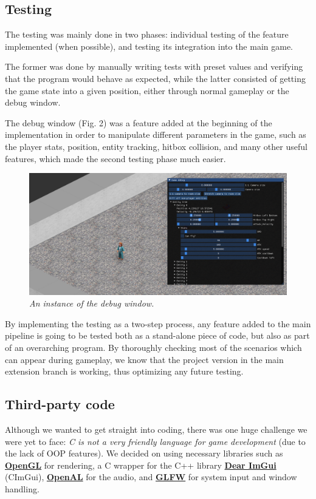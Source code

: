 \documentclass{article}
\begin{document}
\subsection{Testing}
The testing was mainly done in two phases: individual testing of the feature implemented (when possible), and testing its integration into the main game.\par
The former was done by manually writing tests with preset values and verifying that the program would behave as expected, while the latter consisted of getting the game state into a given position, either through normal gameplay or the debug window. \par
The debug window (Fig. 2) was a feature added at the beginning of the implementation in order to manipulate different parameters in the game, such as the player stats, position, entity tracking, hitbox collision, and many other useful features, which made the second testing phase much easier.
\begin{figure}[H]
\includegraphics[scale=0.3]{images/debugwindow.png}
\centering
\caption{\textit{An instance of the debug window.}}
\end{figure}
By implementing the testing as a two-step process, any feature added to the main pipeline is going to be tested both as a stand-alone piece of code, but also as part of an overarching program. By thoroughly checking most of the scenarios which can appear during gameplay, we know that the project version in the main extension branch is working, thus optimizing any future testing.
\subsection{Third-party code}
Although we wanted to get straight into coding, there was one huge challenge we were yet to face: \textit{C is not a very friendly language for game development} (due to the lack of OOP features). We decided on using necessary libraries such as \href{https://www.opengl.org}{\textbf{OpenGL}} for rendering, a C wrapper for the C++ library \href{https://www.dearimgui.com}{\textbf{Dear ImGui}}  (CImGui), \href{https://www.openal.org}{\textbf{OpenAL}} for the audio, and \href{https://www.glfw.org}{\textbf{GLFW}} for system input and window handling.
\end{document}
